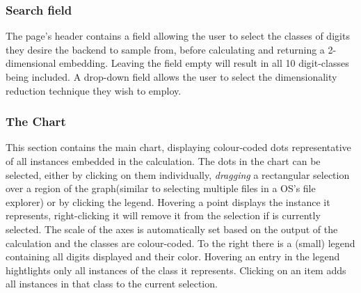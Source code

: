 \documentclass[11pt,a4paper]{article}
\begin{document}
      \subsubsection*{Search field}
        The page's header contains a field allowing the user to select the classes of digits they desire the backend to sample from, before calculating and returning a 2-dimensional embedding. Leaving the field empty will result in all 10 digit-classes being included. A drop-down field allows the user to select the dimensionality reduction technique they wish to employ. 
      \subsubsection*{The Chart}
        This section contains the main chart, displaying colour-coded dots representative of all instances embedded in the calculation. 
        The dots in the chart can be selected, either by clicking on them individually, \textit{dragging} a rectangular selection over a region of the graph(similar to selecting multiple files in a OS's file explorer) or by clicking the legend. Hovering a point displays the instance it represents, right-clicking it will remove it from the selection if is currently selected. 
        The scale of the axes is automatically set based on the output of the calculation and the classes are colour-coded. To the right there is a (small) legend containing all digits displayed and their color. Hovering an entry in the legend hightlights only all instances of the class it represents. Clicking on an item adds all instances in that class to the current selection.
\end{document}
